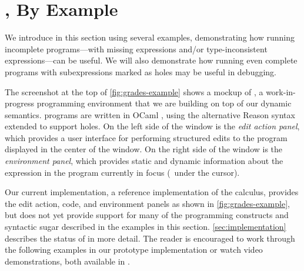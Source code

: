 \newcommand{\examplesSec}{\HazelnutLive, By Example}
\section{\protect\examplesSec} %
\label{sec:examples}

\newcommand{\overviewExample}[2]{\paragraph{Example {#1}: {#2}}}

We introduce \HazelnutLive{} in this section using several examples,
demonstrating how running incomplete programs---with missing expressions and/or
type-inconsistent expressions---can be useful.
%
We will also demonstrate how running even complete programs with subexpressions
marked as holes may be useful in debugging.

The screenshot at the top of \autoref{fig:grades-example} shows a mockup of
\Hazel{}, a work-in-progress programming environment that we are building on top
of our dynamic semantics.
%
\Hazel{} programs are written in OCaml \cite{leroy03:_ocaml}, using the
alternative Reason syntax \cite{reason-what} extended to support holes.
%
On the left side of the window is the \emph{edit action panel}, which
provides a user interface for performing structured edits to the program
displayed in the center of the window.
%
On the right side of the window is the \emph{environment panel}, which provides
static and dynamic information about the expression in the program currently in
focus (\ie{}~under the cursor).

Our current implementation, a reference implementation of the \HazelnutLive{}
calculus, provides the edit action, code, and environment panels as shown in
\autoref{fig:grades-example}, but does not yet provide support for many of the
programming constructs and syntactic sugar described in the examples in this
section.
%
\autoref{sec:implementation} describes the status of \HazelnutLive{} in more
detail.
%
%
%
The reader is encouraged 
to work through the following examples in our prototype
implementation or watch video demonstrations, both available in
\suppMaterials{}.


